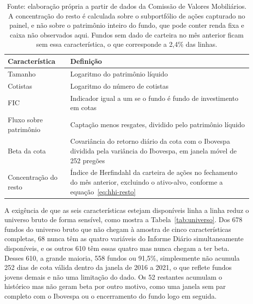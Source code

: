 \documentclass[12pt,a4paper]{article}
\begin{document}
\begin{table}[h]\centering\small
\caption{As seis características do fundo utilizadas na primeira etapa.}
\label{tab:caracteristicas}
\begin{tabular}{@{}p{2.8cm}p{10.5cm}@{}}
\toprule
Característica & Definição \\
\midrule
Tamanho & Logaritmo do patrimônio líquido \\
Cotistas & Logaritmo do número de cotistas \\
FIC & Indicador igual a um se o fundo é fundo de investimento em cotas \\
Fluxo sobre patrimônio & Captação menos resgates, dividido pelo patrimônio líquido \\
Beta da cota & Covariância do retorno diário da cota com o Ibovespa dividida pela variância
do Ibovespa, em janela móvel de 252 pregões \\
Concentração do resto & Índice de Herfindahl da carteira de ações no fechamento do mês
anterior, excluindo o ativo-alvo, conforme a equação~\eqref{eq:hhi-resto} \\
\bottomrule
\end{tabular}
\caption*{\footnotesize Fonte: elaboração própria a partir de dados da Comissão de Valores
Mobiliários. A concentração do resto é calculada sobre o subportfólio de ações capturado no
painel, e não sobre o patrimônio inteiro do fundo, que pode conter renda fixa e caixa não
observados aqui. Fundos sem dado de carteira no mês anterior ficam sem essa característica,
o que corresponde a 2,4\% das linhas.}
\end{table}

A exigência de que as seis características estejam disponíveis linha a linha reduz o
universo bruto de forma sensível, como mostra a Tabela~\ref{tab:universo}. Dos 678 fundos do
universo bruto que não chegam à amostra de cinco características completas, 68 nunca têm as
quatro variáveis do Informe Diário simultaneamente disponíveis, e os outros 610 têm essas
quatro mas nunca chegam a ter beta. Desses 610, a grande maioria, 558 fundos ou 91,5\%,
simplesmente não acumula 252 dias de cota válida dentro da janela de 2016 a 2021, o que
reflete fundos jovens demais e não uma limitação do dado. Os 52 restantes acumulam o
histórico mas não geram beta por outro motivo, como uma janela sem par completo com o
Ibovespa ou o encerramento do fundo logo em seguida.
\end{document}
